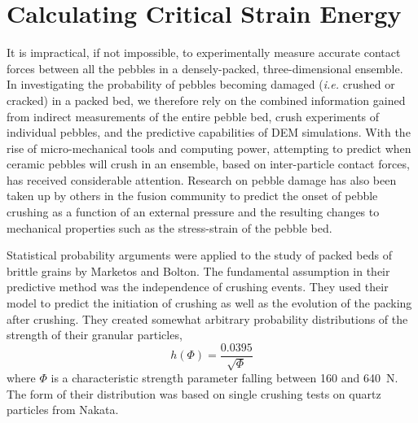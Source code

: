 
\chapter{Calculating Critical Strain Energy}\label{sec:pebble-crush-prediction}
It is impractical, if not impossible, to experimentally measure accurate contact forces between all the pebbles in a densely-packed, three-dimensional ensemble. In investigating the probability of pebbles becoming damaged (\textit{i.e.} crushed or cracked) in a packed bed, we therefore rely on the combined information gained from indirect measurements of the entire pebble bed, crush experiments of individual pebbles, and the predictive capabilities of DEM simulations. With the rise of micro-mechanical tools and computing power, attempting to predict when ceramic pebbles will crush in an ensemble, based on inter-particle contact forces, has received considerable attention.\cite{Marketos2007,Pitchumani2004} Research on pebble damage has also been taken up by others in the fusion community to predict the onset of pebble crushing as a function of an external pressure and the resulting changes to mechanical properties such as the stress-strain of the pebble bed.\cite{Annabattula2012a, Zhao2012, Zhao2013}

Statistical probability arguments were applied to the study of packed beds of brittle grains by Marketos and Bolton\cite{Marketos2007}. The fundamental assumption in their predictive method was the independence of crushing events. They used their model to predict the initiation of crushing as well as the evolution of the packing after crushing. They created somewhat arbitrary probability distributions of the strength of their granular particles,
\begin{equation}
	h(\Phi) = \frac{0.0395}{\sqrt{\Phi}}
\end{equation}
where $\Phi$ is a characteristic strength parameter falling between 160 and 640~N. The form of their distribution was based on single crushing tests on quartz particles from Nakata\etal.


